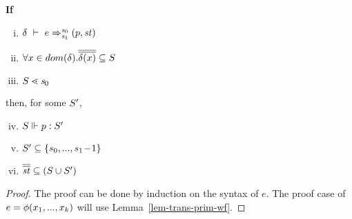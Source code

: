 \begin{thm} \label{thm-trans-wf}
	\textbf{If} 
	\begin{enumerate}[(i)]
		\item $\Trans{\del}{e}{\s_0}{\s_1}{\sfun{p}{\st}}$ 
		\item $\forall x \in dom(\del). \olol{\del(x)} \subseteq \S$ 
		\item  $\S \.< \s_0  $
	\end{enumerate}
	then, for some $\S'$,
	\begin{enumerate}[(i)]
		\setcounter{enumi} {3}
		\item $\wf{p}{\S}{\S'}$
		\item $\S' \subseteq \{s_0,...,s_1\!-\!1\}$
		\item  $\olol{\st} \subseteq (\S \cup \S')$
	\end{enumerate} 
\end{thm}
\begin{proof}
  The proof  can be done by induction on the syntax of $e$. The proof case of $e= \hcall(x_1,...,x_k)$ will use Lemma~\ref{lem-trans-prim-wf}.
\end{proof}


